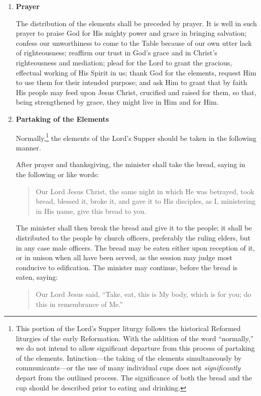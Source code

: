 \documentclass[
]{book}
\begin{document}
\begin{enumerate}
\def\labelenumi{\arabic{enumi}.}
\setcounter{enumi}{5}
\item
  \textbf{Prayer}

  The distribution of the elements shall be preceded by prayer. It is well in such prayer to praise God for His mighty power and grace in bringing salvation; confess our unworthiness to come to the Table because of our own utter lack of righteousness; reaffirm our trust in God's grace and in Christ's righteousness and mediation; plead for the Lord to grant the gracious, effectual working of His Spirit in us; thank God for the elements, request Him to use them for their intended purpose; and ask Him to grant that by faith His people may feed upon Jesus Christ, crucified and raised for them, so that, being strengthened by grace, they might live in Him and for Him.
\item
  \textbf{Partaking of the Elements}

  Normally,\footnote{This portion of the Lord's Supper liturgy follows the historical Reformed liturgies of the early Reformation. With the addition of the word ``normally,'' we do not intend to allow significant departure from this process of partaking of the elements. Intinction---the taking of the elements simultaneously by communicants---or the use of many individual cups does not \emph{significantly} depart from the outlined process. The significance of both the bread and the cup should be described prior to eating and drinking.} the elements of the Lord's Supper should be taken in the following manner.

  After prayer and thanksgiving, the minister shall take the bread, saying in the following or like words:

  \begin{quote}
  Our Lord Jesus Christ, the same night in which He was betrayed, took bread, blessed it, broke it, and gave it to His disciples, as I, ministering in His name, give this bread to you.
  \end{quote}

  The minister shall then break the bread and give it to the people; it shall be distributed to the people by church officers, preferably the ruling elders, but in any case male officers. The bread may be eaten either upon reception of it, or in unison when all have been served, as the session may judge most conducive to edification. The minister may continue, before the bread is eaten, saying:

  \begin{quote}
  Our Lord Jesus said, ``Take, eat, this is My body, which is for you; do this in remembrance of Me.''
  \end{quote}


\end{enumerate}
\end{document}
